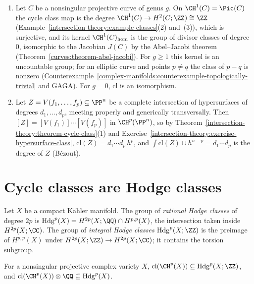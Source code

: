 \begin{example}\label{intersection-theory:example-kernel-curves}
\begin{enumerate}
\item Let $C$ be a nonsingular projective curve of genus $g$. On $\CH^1(C) = \Pic(C)$ the cycle class map is the degree $\CH^1(C) \to H^2(C; \ZZ) \cong \ZZ$ (Example~\ref{intersection-theory:example-classes}(2) and~(3)),
which is surjective, and its kernel $\CH^1(C)_{\mathrm{hom}}$ is the group of divisor classes of degree $0$, isomorphic to the Jacobian $J(C)$ by the Abel--Jacobi theorem
(Theorem~\ref{curves:theorem-abel-jacobi}). For $g \geq 1$ this kernel is an uncountable group; for an elliptic curve and points $p \neq q$ the class of $p - q$ is nonzero
(Counterexample~\ref{complex-manifolds:counterexample-topologically-trivial} and GAGA). For $g = 0$, $\mathrm{cl}$ is an isomorphism.
\item Let $Z = V(f_1, \ldots, f_p) \subseteq \PP^n$ be a complete intersection of hypersurfaces of degrees $d_1, \ldots, d_p$, meeting properly and generically transversally. Then
$[Z] = [V(f_1)] \cdots [V(f_p)]$ in $\CH^p(\PP^n)$, so by Theorem~\ref{intersection-theory:theorem-cycle-class}(1) and Exercise~\ref{intersection-theory:exercise-hypersurface-class},
$\mathrm{cl}(Z) = d_1 \cdots d_p\,h^p$, and $\int\mathrm{cl}(Z) \cup h^{n-p} = d_1 \cdots d_p$ is the degree of $Z$ (B\'ezout).
\end{enumerate}
\end{example}

\section{Cycle classes are Hodge classes}\label{intersection-theory:section-hodge-classes}

\begin{definition}\label{intersection-theory:definition-hodge-classes}
Let $X$ be a compact K\"ahler manifold. The group of \emph{rational Hodge classes} of degree $2p$ is $\mathrm{Hdg}^p(X) = H^{2p}(X; \QQ) \cap H^{p,p}(X)$, the intersection taken inside
$H^{2p}(X; \CC)$. The group of \emph{integral Hodge classes} $\mathrm{Hdg}^p(X; \ZZ)$ is the preimage of $H^{p,p}(X)$ under $H^{2p}(X; \ZZ) \to H^{2p}(X; \CC)$; it contains the torsion
subgroup.
\end{definition}

\begin{corollary}\label{intersection-theory:corollary-hodge-classes}
For a nonsingular projective complex variety $X$, $\mathrm{cl}(\CH^p(X)) \subseteq \mathrm{Hdg}^p(X; \ZZ)$, and $\mathrm{cl}(\CH^p(X)) \otimes \QQ \subseteq \mathrm{Hdg}^p(X)$.
\end{corollary}

